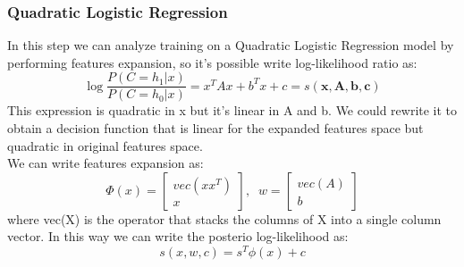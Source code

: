 \subsubsection{Quadratic Logistic Regression}
In this step we can analyze training on a Quadratic Logistic Regression model by performing features expansion, so it's possible write log-likelihood ratio as:
\begin{equation}
    \log{\frac{P(C=h_1|x)}{P(C=h_0|x)}}=x^TAx+b^Tx+c=s(\textbf{x},\textbf{A},\textbf{b},\textbf{c})
\end{equation}
This expression is quadratic in x but it's linear in A and b.
We could rewrite it to obtain a decision function that is linear for the expanded features space but quadratic in original features space.\\
We can write features expansion as:
\begin{equation}
    \Phi(x)=
    \begin{bmatrix}
        vec(xx^T) \\
        x
    \end{bmatrix},
    \;\;
    w=
    \begin{bmatrix}
        vec(A) \\
        b
    \end{bmatrix}
\end{equation}
where vec(X) is the operator that stacks the columns of X into a single column vector. In this way we can write the posterio log-likelihood as:
\begin{equation}
    s(x,w,c)=s^T\phi(x)+c
\end{equation}

